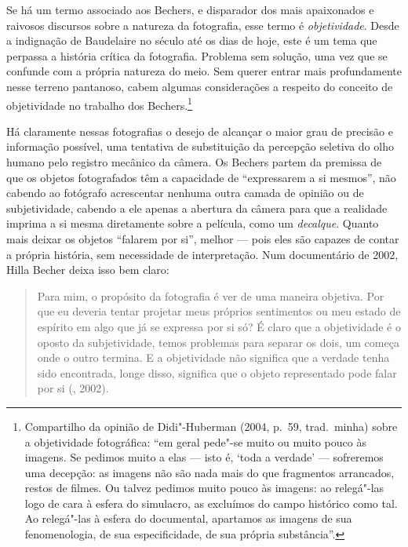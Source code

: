 Se há um termo associado aos Bechers, e disparador dos mais apaixonados
e raivosos discursos sobre a natureza da fotografia, esse termo é
\emph{objetividade}. Desde a indignação de Baudelaire no século  até
os dias de hoje, este é um tema que perpassa a história crítica da
fotografia. Problema sem solução, uma vez que se confunde com a própria
natureza do meio. Sem querer entrar mais profundamente nesse terreno
pantanoso, cabem algumas considerações a respeito do conceito de
objetividade no trabalho dos Bechers.\footnote{Compartilho da opinião de
  Didi"-Huberman (2004, p.~59, trad.~minha) sobre a objetividade fotográfica: ``em geral pede"-se
  muito ou muito pouco às imagens. Se pedimos muito a elas --- isto é,
  `toda a verdade' --- sofreremos uma decepção: as imagens não são nada
  mais do que fragmentos arrancados, restos de filmes. Ou talvez pedimos
  muito pouco às imagens: ao relegá"-las logo de cara à esfera do
  simulacro, as excluímos do campo histórico como tal. Ao relegá"-las à
  esfera do documental, apartamos as imagens de sua fenomenologia, de
  sua especificidade, de sua própria substância''.}

Há claramente nessas fotografias o desejo de alcançar o maior grau de
precisão e informação possível, uma tentativa de substituição da
percepção seletiva do olho humano pelo registro mecânico da câmera. Os
Bechers partem da premissa de que os objetos fotografados têm a
capacidade de ``expressarem a si mesmos'', não cabendo ao fotógrafo
acrescentar nenhuma outra camada de opinião ou de subjetividade, cabendo
a ele apenas a abertura da câmera para que a realidade imprima a si
mesma diretamente sobre a película, como um \emph{decalque}. Quanto mais
deixar os objetos ``falarem por si'', melhor --- pois eles são capazes de
contar a própria história, sem necessidade de interpretação. Num
documentário de 2002, Hilla Becher deixa isso bem claro:

\begin{quote}
Para mim, o propósito da fotografia é ver de uma maneira objetiva. Por
que eu deveria tentar projetar meus próprios sentimentos ou meu estado
de espírito em algo que já se expressa por si só? É claro que a
objetividade é o oposto da subjetividade, temos problemas para separar
os dois, um começa onde o outro termina. E a objetividade não significa
que a verdade tenha sido encontrada, longe disso, significa que o objeto
representado pode falar por si (, 2002).
\end{quote}

